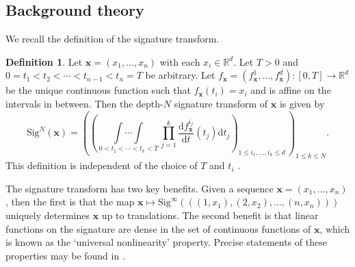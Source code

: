 \documentclass{article}
\theoremstyle{definition}
\newtheorem{definition}{Definition}
\theoremstyle{remark}
\newcommand{\reals}{\mathbb{R}}
\begin{document}
	
	\subsection{Background theory}
	We recall the definition of the signature transform.

	\begin{definition}
	Let $\mathbf{x} = (x_1, \ldots, x_n)$ with each $x_i \in \reals^d$. Let $T > 0$ and $0 = t_1 < t_2 < \cdots < t_{n - 1} < t_n = T$ be arbitrary. Let $f_{\mathbf{x}} = (f^1_{\mathbf{x}}, \ldots, f^d_{\mathbf{x}}) \colon [0, T] \to \reals^d$ be the unique continuous function such that $f_{\mathbf{x}}(t_i) = x_i$ and is affine on the intervals in between. Then the depth-$N$ signature transform of ${\mathbf{x}}$ is given by
	\begin{equation}
	\label{eq:signature_depth_N}
		\mathrm{Sig}^N(\mathbf x) = \left(\left( \,\underset{0 < t_1 < \cdots < t_k < T}{\int\cdots\int} \,\prod_{j = 1}^k \frac{\mathrm d f^{i_j}_{\mathbf{x}}}{\mathrm dt}(t_j) \mathrm dt_j \right)_{\!\!1 \leq i_1, \ldots, i_k \leq d}\,\right)_{\!\!1 \leq k \leq N}.
	\end{equation}
	This definition is independent of the choice of $T$ and $t_i$ \cite[Proposition A.7]{kidger2019deep}.
	\end{definition}

	
	The signature transform has two key benefits. Given a sequence $\mathbf{x} = (x_1, \ldots, x_n)$, then the first is that the map $\mathbf{x} \mapsto \mathrm{Sig}^\infty(((1, x_1), (2, x_2), \ldots, (n, x_n)))$ uniquely determines $\mathbf{x}$ up to translations. The second benefit is that linear functions on the signature are dense in the set of continuous functions of $\mathbf{x}$, which is known as the `universal nonlinearity' property. Precise statements of these properties may be found in \citet[Appendix A]{kidger2019deep}.
	
\end{document}
